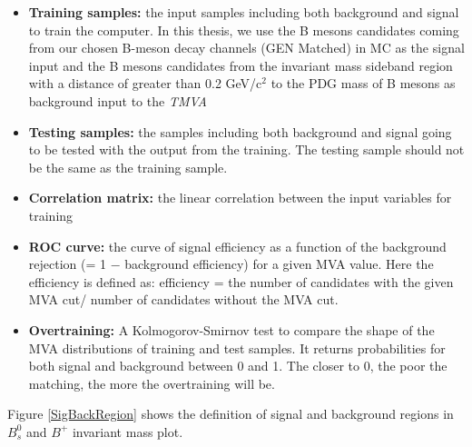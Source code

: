 \begin{itemize}
\item \textbf{Training samples:} the input samples including both background and signal to train the computer. In this thesis, we use the B mesons candidates coming from our chosen B-meson decay channels (GEN Matched) in MC as the signal input and the B mesons candidates from the invariant mass sideband region with a distance of greater than 0.2 GeV/c$^{2}$ to the PDG mass of B mesons as background input to the \textit{TMVA} 
\item \textbf{Testing samples:} the samples including both background and signal going to be tested with the output from the training. The testing sample should not be the same as the training sample.
\item \textbf{Correlation matrix:} the linear correlation between the input variables for training 
\item \textbf{ROC curve:} the curve of signal efficiency as a function of the background rejection (= 1 $-$ background efficiency) for a given MVA value. Here the efficiency is defined as: efficiency = the number of candidates with the given MVA cut/ number of candidates without the MVA cut.
\item \textbf{Overtraining:} A Kolmogorov-Smirnov test \cite{KSTest} to compare the shape of the MVA distributions of training and test samples. It returns probabilities for both signal and background between 0 and 1. The closer to 0, the poor the matching, the more the overtraining will be.  
\end{itemize}


Figure \ref{SigBackRegion} shows the definition of signal and background regions in $B^0_s$ and $B^+$ invariant mass plot. 

